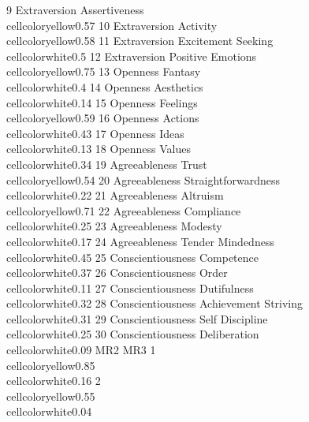 \documentclass{article}\usepackage[]{graphicx}\usepackage[]{color}
\begin{document}
9       Extraversion        Assertiveness \\cellcolor{yellow}{0.57}
10      Extraversion             Activity \\cellcolor{yellow}{0.58}
11      Extraversion   Excitement Seeking   \\cellcolor{white}{0.5}
12      Extraversion    Positive Emotions \\cellcolor{yellow}{0.75}
13          Openness              Fantasy   \\cellcolor{white}{0.4}
14          Openness           Aesthetics  \\cellcolor{white}{0.14}
15          Openness             Feelings \\cellcolor{yellow}{0.59}
16          Openness              Actions  \\cellcolor{white}{0.43}
17          Openness                Ideas  \\cellcolor{white}{0.13}
18          Openness               Values  \\cellcolor{white}{0.34}
19     Agreeableness                Trust \\cellcolor{yellow}{0.54}
20     Agreeableness  Straightforwardness  \\cellcolor{white}{0.22}
21     Agreeableness             Altruism \\cellcolor{yellow}{0.71}
22     Agreeableness           Compliance  \\cellcolor{white}{0.25}
23     Agreeableness              Modesty  \\cellcolor{white}{0.17}
24     Agreeableness    Tender Mindedness  \\cellcolor{white}{0.45}
25 Conscientiousness           Competence  \\cellcolor{white}{0.37}
26 Conscientiousness                Order  \\cellcolor{white}{0.11}
27 Conscientiousness          Dutifulness  \\cellcolor{white}{0.32}
28 Conscientiousness Achievement Striving  \\cellcolor{white}{0.31}
29 Conscientiousness      Self Discipline  \\cellcolor{white}{0.25}
30 Conscientiousness         Deliberation  \\cellcolor{white}{0.09}
                         MR2                       MR3
1  \\cellcolor{yellow}{0.85}  \\cellcolor{white}{0.16}
2  \\cellcolor{yellow}{0.55}  \\cellcolor{white}{0.04}
\end{document}
